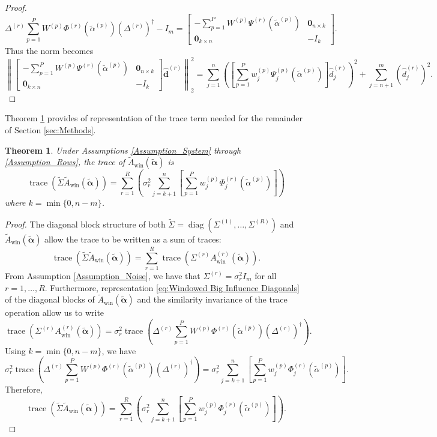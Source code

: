 \documentclass[12pt]{article}
\newcommand{\dVec}{\mathbf{d}}	%
\newcommand{\pinv}[1]{{#1}^\dagger}	%
\DeclareMathOperator{\trace}{trace}		%
\DeclareMathOperator{\diag}{diag}	%
\newcommand{\regparam}{\alpha}  %
\newcommand{\regparamVec}{\bm{\regparam}}   %
\newcommand{\regparamBig}{\widetilde{\regparam}}   %
\newcommand{\regparamVecBig}{\widetilde{\regparamVec}}   %
\newcommand{\AWin}{A_{\text{win}}}	%
\newcommand{\AWinBig}{\widetilde{A}_{\text{win}}}	%
\newcommand{\noiseSD}{\sigma}	%
\newcommand{\zeroVec}{\bm{0}}	%
\newcommand{\svd}[1]{\widehat{#1}}	%
\newtheorem{theorem}{Theorem}[section]
\begin{document}
\begin{proof}
\[\Delta^{(r)}\sum_{p=1}^{P} W^{(p)}\Phi^{(r)}\left(\widetilde{\regparam}^{(p)}\right)\pinv{\left(\Delta^{(r)}\right)} - I_m = \begin{bmatrix}
-\sum_{p=1}^{P} W^{(p)} \Psi^{(r)}\left(\widetilde{\regparam}^{(p)}\right) & \zeroVec_{n \times k} \\
\zeroVec_{k \times n} & -I_k
\end{bmatrix}.\]
Thus the norm becomes
\[\left\|\begin{bmatrix}
-\sum_{p=1}^{P} W^{(p)} \Psi^{(r)}\left(\widetilde{\regparam}^{(p)}\right) & \zeroVec_{n \times k} \\
\zeroVec_{k \times n} & -I_k
\end{bmatrix}\svd{\dVec}^{(r)}\right\|_2^2 = \sum_{j=1}^{n} \left(\left[\sum_{p=1}^{P} w_{j}^{(p)}\Psi_{j}^{(p)}\left(\regparamBig^{(p)}\right)\right] \hat{d}_j^{(r)}\right)^2 + \sum_{j=n+1}^{m} \left(\hat{d}_j^{(r)}\right)^2.\]
\end{proof}

Theorem \ref{thm:Trace} provides of representation of the trace term needed for the remainder of Section \ref{sec:Methods}.

\begin{theorem}
\label{thm:Trace}
Under Assumptions \ref{Assumption_System} through \ref{Assumption_Rows}, the trace of $\AWinBig(\regparamVecBig)$ is
\[\trace\left(\widetilde{\Sigma}\AWinBig(\regparamVecBig)\right) = \sum_{r=1}^{R} \left( \noiseSD_r^2 \sum_{j = k+1}^{n} \left[\sum_{p=1}^{P} w_j^{(p)} \Phi_j^{(r)}\left(\regparamBig^{(p)}\right)\right] \right)\]
where $k = \min\{0,n-m\}$.
\end{theorem}
\begin{proof}
The diagonal block structure of both $\widetilde{\Sigma} = \diag\left(\Sigma^{(1)},\ldots,\Sigma^{(R)}\right)$ and $\AWinBig(\regparamVecBig)$ allow the trace to be written as a sum of traces:
\[\trace\left(\widetilde{\Sigma}\AWinBig(\regparamVecBig)\right) = \sum_{r=1}^{R} \trace\left(\Sigma^{(r)}\AWin^{(r)}\left(\regparamVecBig\right)\right).\]
From Assumption \ref{Assumption_Noise}, we have that $\Sigma^{(r)} = \noiseSD_r^2 I_m$ for all $r = 1,\ldots,R$. Furthermore, representation \eqref{eq:Windowed Big Influence Diagonals} of the diagonal blocks of $\AWinBig(\regparamVecBig)$ and the similarity invariance of the trace operation allow us to write
\[\trace\left(\Sigma^{(r)}\AWin^{(r)}\left(\regparamVecBig\right)\right) = \noiseSD_r^2 \trace\left(\Delta^{(r)}\sum_{p=1}^{P}W^{(p)}\Phi^{(r)}\left(\regparamBig^{(p)}\right)\pinv{\left(\Delta^{(r)}\right)}\right).\]
Using $k = \min\{0,n-m\}$, we have
\[\noiseSD_r^2 \trace\left(\Delta^{(r)}\sum_{p=1}^{P}W^{(p)}\Phi^{(r)}\left(\regparamBig^{(p)}\right)\pinv{\left(\Delta^{(r)}\right)}\right) = \noiseSD_r^2 \sum_{j = k+1}^{n} \left[\sum_{p=1}^{P} w_j^{(p)} \Phi_j^{(r)}\left(\regparamBig^{(p)}\right)\right].\]
Therefore,
\[\trace\left(\widetilde{\Sigma}\AWinBig(\regparamVecBig)\right) = \sum_{r=1}^{R} \left( \noiseSD_r^2 \sum_{j = k+1}^{n} \left[\sum_{p=1}^{P} w_j^{(p)} \Phi_j^{(r)}\left(\regparamBig^{(p)}\right)\right] \right).\]
\end{proof}
\end{document}
